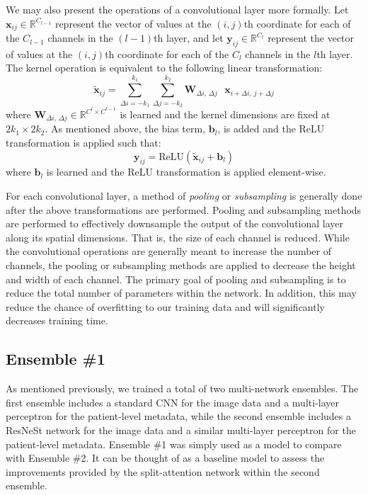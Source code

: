 \documentclass [MAS] {uclathes}
\begin{document}
We may also present the operations of a convolutional layer more formally. Let $\mathbf{x}_{i j} \in \mathbb{R}^{C_{l-1}}$ represent the vector of values at the $(i, j)$th coordinate for each of the $C_{l-1}$ channels in the $(l-1)$th layer, and let $\mathbf{y}_{i j} \in \mathbb{R}^{C_{l}}$ represent the vector of values at the $(i, j)$th coordinate for each of the $C_{l}$ channels in the $l$th layer. The kernel operation is equivalent to the following linear transformation: $$\tilde{\mathbf{x}}_{i j} = \sum_{\Delta i = -k_1}^{k_1} \sum_{\Delta j = -k_2}^{k_2} \mathbf{W}_{\Delta i \text{, } \Delta j} \text{ } \mathbf{x}_{i+\Delta i \text{, } j+\Delta j}$$ where $\mathbf{W}_{\Delta i \text{, } \Delta j} \in \mathbb{R}^{C^{l} \times C^{l-1}}$ is learned and the kernel dimensions are fixed at $2k_1 \times 2k_2$. As mentioned above, the bias term, $\mathbf{b}_{l}$, is added and the ReLU transformation is applied such that: $$\mathbf{y}_{i j} = \text{ReLU}(\tilde{\mathbf{x}}_{i j} + \mathbf{b}_{l})$$ where $\mathbf{b}_{l}$ is learned and the ReLU transformation is applied element-wise.

For each convolutional layer, a method of \textit{pooling} or \textit{subsampling} is generally done after the above transformations are performed. Pooling and subsampling methods are performed to effectively downsample the output of the convolutional layer along its spatial dimensions. That is, the size of each channel is reduced. While the convolutional operations are generally meant to increase the number of channels, the pooling or subsampling methods are applied to decrease the height and width of each channel. The primary goal of pooling and subsampling is to reduce the total number of parameters within the network. In addition, this may reduce the chance of overfitting to our training data and will significantly decreases training time.

\subsection{Ensemble \#1}

As mentioned previously, we trained a total of two multi-network ensembles. The first ensemble includes a standard CNN for the image data and a multi-layer perceptron for the patient-level metadata, while the second ensemble includes a ResNeSt network for the image data and a similar multi-layer perceptron for the patient-level metadata. Ensemble \#1 was simply used as a model to compare with Ensemble \#2. It can be thought of as a baseline model to assess the improvements provided by the split-attention network within the second ensemble. 
\end{document}

